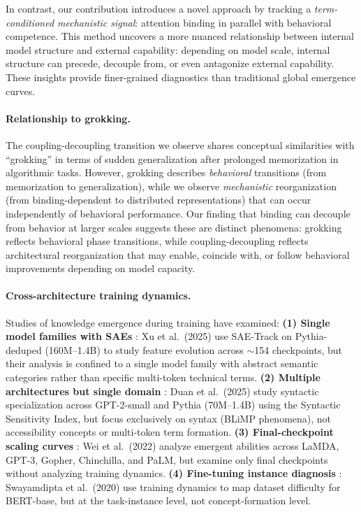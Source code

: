 \documentclass[10pt]{article} %
\begin{document}
In contrast, our contribution introduces a novel approach by tracking a \emph{term-conditioned mechanistic signal}: attention binding in parallel with behavioral competence.
This method uncovers a more nuanced relationship between internal model structure and external capability: depending on model scale, internal structure can precede, decouple from, or even antagonize external capability. These insights provide finer-grained diagnostics than traditional global emergence curves.

\paragraph{Relationship to grokking.}
The coupling-decoupling transition we observe shares conceptual similarities with ``grokking'' \citep{power2022grokking} in terms of sudden generalization after prolonged memorization in algorithmic tasks.
However, grokking describes \emph{behavioral} transitions (from memorization to generalization), while we observe \emph{mechanistic} reorganization (from binding-dependent to distributed representations) that can occur independently of behavioral performance.
Our finding that binding can decouple from behavior at larger scales suggests these are distinct phenomena: grokking reflects behavioral phase transitions, while coupling-decoupling reflects architectural reorganization that may enable, coincide with, or follow behavioral improvements depending on model capacity.

\paragraph{Cross-architecture training dynamics.}
Studies of knowledge emergence during training have examined:
\textbf{(1) Single model families with SAEs} \citep{xu2025tracking}: Xu et al.\ (2025) use SAE-Track on Pythia-deduped (160M--1.4B) to study feature evolution across $\sim$154 checkpoints, but their analysis is confined to a single model family with abstract semantic categories rather than specific multi-token technical terms.
\textbf{(2) Multiple architectures but single domain} \citep{duan2025syntax}: Duan et al.\ (2025) study syntactic specialization across GPT-2-small and Pythia (70M--1.4B) using the Syntactic Sensitivity Index, but focus exclusively on syntax (BLiMP phenomena), not accessibility concepts or multi-token term formation.
\textbf{(3) Final-checkpoint scaling curves} \citep{wei2022emergent}: Wei et al.\ (2022) analyze emergent abilities across LaMDA, GPT-3, Gopher, Chinchilla, and PaLM, but examine only final checkpoints without analyzing training dynamics.
\textbf{(4) Fine-tuning instance diagnosis} \citep{swayamdipta2020dataset}: Swayamdipta et al.\ (2020) use training dynamics to map dataset difficulty for BERT-base, but at the task-instance level, not concept-formation level.
\end{document}
